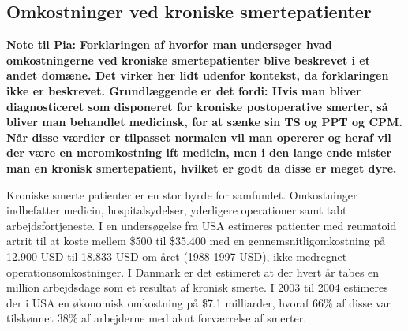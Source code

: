 \subsection{Omkostninger ved kroniske smertepatienter}
\textbf{Note til Pia: Forklaringen af hvorfor man undersøger hvad omkostningerne ved kroniske smertepatienter blive beskrevet i et andet domæne. Det virker her lidt udenfor kontekst, da forklaringen ikke er beskrevet. Grundlæggende er det fordi: Hvis man bliver diagnosticeret som disponeret for kroniske postoperative smerter, så bliver man behandlet medicinsk, for at sænke sin TS og PPT og CPM. Når disse værdier er tilpasset normalen vil man opererer og heraf vil der være en meromkostning ift medicin, men i den lange ende mister man en kronisk smertepatient, hvilket er godt da disse er meget dyre.}

Kroniske smerte patienter er en stor byrde for samfundet. Omkostninger indbefatter medicin, hospitalsydelser, yderligere operationer samt tabt arbejdsfortjeneste. I en undersøgelse fra USA estimeres patienter med reumatoid artrit til at koste mellem \$500 til \$35.400 med en gennemsnitligomkostning på 12.900 USD til 18.833 USD om året (1988-1997 USD), ikke medregnet operationsomkostninger. \citep{Turk2002} I Danmark er det estimeret at der hvert år tabes en million arbejdsdage som et resultat af kronisk smerte. \citep{Eriksen2006} I 2003 til 2004 estimeres der i USA en økonomisk omkostning på \$7.1 milliarder, hvoraf 66\% af disse var tilskønnet 38\% af arbejderne med akut forværrelse af smerter. \citep{Phillips2009} %

